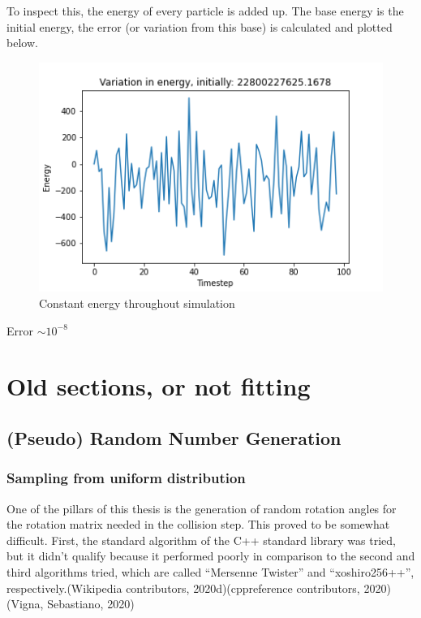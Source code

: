 \documentclass[
]{article}
\begin{document}
To inspect this, the energy of every particle is added up. The base
energy is the initial energy, the error (or variation from this base) is
calculated and plotted below.

\begin{figure}
\centering
\includegraphics{Assets/constant_energy.png}
\caption{Constant energy throughout simulation}
\end{figure}

Error \(\sim 10^{-8}\)

\hypertarget{old-sections-or-not-fitting}{%
\section{Old sections, or not
fitting}\label{old-sections-or-not-fitting}}

\hypertarget{pseudo-random-number-generation}{%
\subsection{(Pseudo) Random Number
Generation}\label{pseudo-random-number-generation}}

\hypertarget{sampling-from-uniform-distribution}{%
\subsubsection{Sampling from uniform
distribution}\label{sampling-from-uniform-distribution}}

One of the pillars of this thesis is the generation of random rotation
angles for the rotation matrix needed in the collision step. This proved
to be somewhat difficult. First, the standard algorithm of the C++
standard library was tried, but it didn't qualify because it performed
poorly in comparison to the second and third algorithms tried, which are
called ``Mersenne Twister'' and ``xoshiro256++'',
respectively.(Wikipedia contributors, 2020d)(cppreference contributors,
2020)(Vigna, Sebastiano, 2020)
\end{document}
